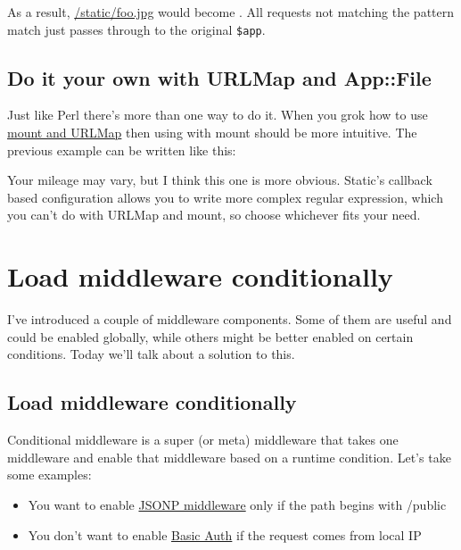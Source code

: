 As a result, \url{/static/foo.jpg} would become
. All requests not matching the pattern match
just passes through to the original \lstinline!$app!.

\section{Do it your own with URLMap and
App::File}\label{do-it-your-own-with-urlmap-and-appfile}

Just like Perl there's more than one way to do it. When you grok how to
use
\href{http://advent.plackperl.org/2009/12/day-12-maps-multiple-apps-with-mount-and-urlmap.html}{mount
and URLMap} then using  with mount should be more intuitive.
The previous example can be written like this:


Your mileage may vary, but I think this one is more obvious. Static's
callback based configuration allows you to write more complex regular
expression, which you can't do with URLMap and mount, so choose
whichever fits your need.

\chapter{Load middleware
conditionally}\label{day-18-load-middleware-conditionally}

I've introduced a couple of middleware components. Some of them are
useful and could be enabled globally, while others might be better
enabled on certain conditions. Today we'll talk about a solution to
this.

\section{Load middleware
conditionally}\label{load-middleware-conditionally}

Conditional middleware is a super (or meta) middleware that takes one
middleware and enable that middleware based on a runtime condition.
Let's take some examples:

\begin{itemize}
\itemsep1pt\parskip0pt
\item
  You want to enable
  \href{http://advent.plackperl.org/2009/12/day-16-adding-jsonp-support-to-your-app.html}{JSONP
  middleware} only if the path begins with /public
\item
  You don't want to enable
  \href{http://advent.plackperl.org/2009/12/day-15-authenticate-your-app-with-middleware.html}{Basic
  Auth} if the request comes from local IP
\end{itemize}

